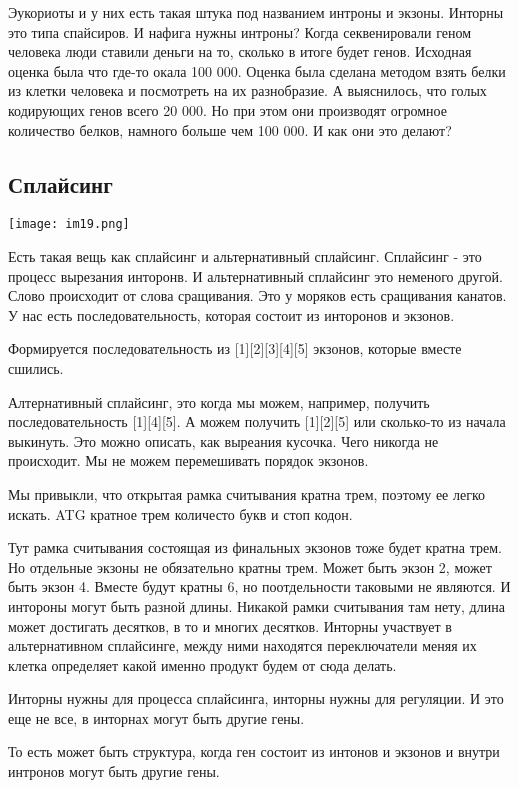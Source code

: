 Эукориоты и у них есть такая штука под названием интроны и экзоны. 
Инторны это типа спайсиров. И нафига нужны интроны? Когда 
секвенировали геном человека люди ставили деньги на то, 
сколько в итоге будет генов. Исходная оценка была что 
где-то окала 100 000. Оценка была сделана методом 
взять белки из клетки человека и посмотреть на их 
разнобразие. А выяснилось, что 
голых кодирующих генов всего 
20 000. Но при этом они производят 
огромное количество белков, намного больше чем 100 000. 
И как они это делают? 

\subsection{Сплайсинг}
\texttt{[image: im19.png]}

Есть такая вещь как сплайсинг и альтернативный сплайсинг. 
Сплайсинг - это процесс вырезания инторонв. И альтернативный 
сплайсинг это неменого другой. Слово происходит от слова сращивания. 
Это у моряков есть сращивания канатов. У нас есть последовательность, 
которая состоит из инторонов и экзонов. 

Формируется последовательность из [1][2][3][4][5] экзонов, которые вместе сшились. 

Алтернативный сплайсинг, это когда мы можем, например, получить 
последовательность [1][4][5]. А можем 
получить [1][2][5] или сколько-то из начала выкинуть. Это 
можно описать, как выреания кусочка. Чего никогда не происходит. 
Мы не можем перемешивать порядок экзонов. 

Мы привыкли, что открытая рамка считывания кратна трем, поэтому ее легко искать. 
ATG кратное трем количесто букв и стоп кодон. 

Тут рамка считывания состоящая из финальных экзонов тоже будет 
кратна трем. Но отдельные экзоны не обязательно кратны трем. 
Может быть экзон 2, может быть экзон 4. Вместе будут 
кратны 6, но поотдельности таковыми не являются. И 
интороны могут быть разной длины. Никакой рамки считывания 
там нету, длина может достигать десятков, в то и многих десятков. 
Инторны участвует в альтернативном сплайсинге, между ними 
находятся переключатели меняя их клетка определяет 
какой именно продукт будем от сюда делать. 

Инторны нужны для процесса сплайсинга, инторны нужны для регуляции. 
И это еще не все, в инторнах могут быть другие гены. 

То есть может быть структура, когда ген состоит из интонов и экзонов и внутри интронов 
могут быть другие гены. 

